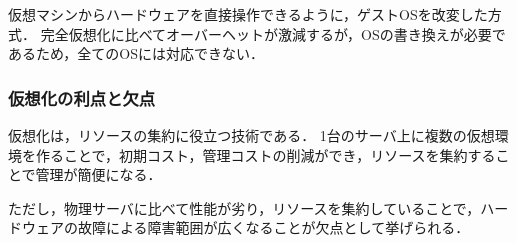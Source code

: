 \begin{description}
    \setlength{\leftskip}{1em}
    \item[準仮想化] 仮想マシンからハードウェアを直接操作できるように，ゲストOSを改変した方式．
        完全仮想化に比べてオーバーヘットが激減するが，OSの書き換えが必要であるため，全てのOSには対応できない．
\end{description}
\subsubsection*{仮想化の利点と欠点}
仮想化は，リソースの集約に役立つ技術である．
1台のサーバ上に複数の仮想環境を作ることで，初期コスト，管理コストの削減ができ，リソースを集約することで管理が簡便になる．\par
ただし，物理サーバに比べて性能が劣り，リソースを集約していることで，ハードウェアの故障による障害範囲が広くなることが欠点として挙げられる．
